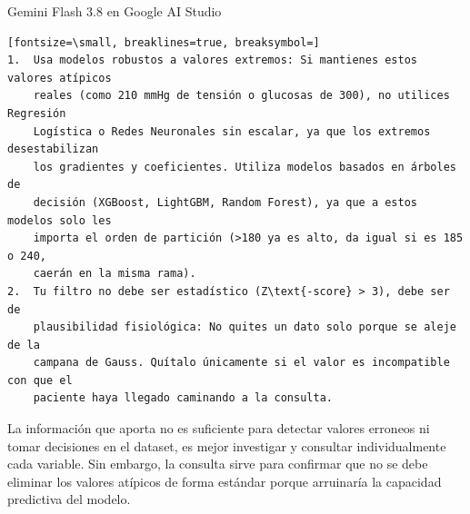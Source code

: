 \documentclass[12pt,a4paper,oneside]{book}
\begin{document}
\begin{iaresp}{Gemini Flash 3.8 en Google AI Studio}
\begin{Verbatim}[fontsize=\small, breaklines=true, breaksymbol=]
1.  Usa modelos robustos a valores extremos: Si mantienes estos valores atípicos
    reales (como 210 mmHg de tensión o glucosas de 300), no utilices Regresión
    Logística o Redes Neuronales sin escalar, ya que los extremos desestabilizan
    los gradientes y coeficientes. Utiliza modelos basados en árboles de
    decisión (XGBoost, LightGBM, Random Forest), ya que a estos modelos solo les
    importa el orden de partición (>180 ya es alto, da igual si es 185 o 240,
    caerán en la misma rama).
2.  Tu filtro no debe ser estadístico (Z\text{-score} > 3), debe ser de
    plausibilidad fisiológica: No quites un dato solo porque se aleje de la
    campana de Gauss. Quítalo únicamente si el valor es incompatible con que el
    paciente haya llegado caminando a la consulta.
\end{Verbatim}
\end{iaresp}
\begin{iaanalisis}
La información que aporta no es suficiente para detectar valores erroneos ni tomar decisiones en el dataset, es mejor investigar y consultar individualmente cada variable. Sin embargo, la consulta sirve para confirmar que no se debe eliminar los valores atípicos de forma estándar  porque arruinaría la capacidad predictiva del modelo.
\end{iaanalisis}
\end{document}
